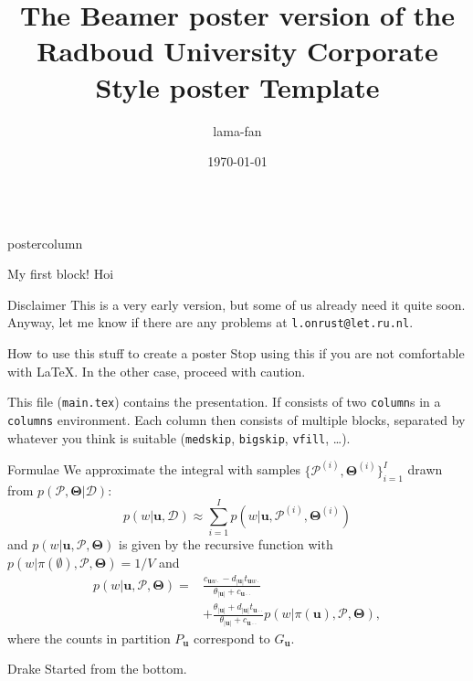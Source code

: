 \documentclass[roundedcorners=true, titleposition=left]{beamerthemeruhuisstijlposter}
\institute[CLS]{Centre for Language Studies, Radboud University Nijmegen, Nijmegen, the Netherlands}
\title{The Beamer poster version of the Radboud University Corporate Style poster Template}
\date{\today}
\author{lama-fan}
\begin{document}
\begin{frame}
\begin{columns}
\begin{column}{0.49\textwidth}
\begin{beamercolorbox}[center, wd=\textwidth]{postercolumn}
\begin{minipage}[T]{0.95\textwidth}
\parbox[t][\columnheight]{\textwidth}{%
  \begin{block}{My first block!}
  	Hoi
  \end{block}
  \medskip
  \begin{block}{Disclaimer}
  	This is a very early version, but some of us already need it quite soon. Anyway, let me know if there are any problems at \texttt{l.onrust@let.ru.nl}.
  \end{block}
 	\medskip
    \begin{block}{How to use this stuff to create a poster}
    	Stop using this if you are not comfortable with \LaTeX. In the other case, proceed with caution.
        
        This file (\texttt{main.tex}) contains the presentation. If consists of two \texttt{column}s in a \texttt{columns} environment. Each column then consists of multiple blocks, separated by whatever you think is suitable (\texttt{medskip}, \texttt{bigskip}, \texttt{vfill}, \ldots). 
    \end{block}
    \medskip
    \begin{block}{Formulae}
    	We approximate the integral with samples $\{\mathcal{P}^{(i)}, \boldsymbol\Theta^{(i)}\}_{i=1}^I$ drawn from $p(\mathcal{P}, \boldsymbol\Theta|\mathcal{D})$: 
  	\begin{equation}
    	p(w|\mathbf{u},\mathcal{D})\approx\sum_{i=1}^{I}p(w|\mathbf{u},\mathcal{P}^{(i)},\boldsymbol\Theta^{(i)})
        \end{equation}
  and $p(w|\mathbf{u}, \mathcal{P},\boldsymbol\Theta)$ is given by the recursive function with  $p(w|\pi(\emptyset),\mathcal{P},\boldsymbol\Theta) = 1/V$ and 
  \begin{equation}
  	\begin{split}
    	p(w|\mathbf{u},\mathcal{P},\boldsymbol\Theta) = &\frac{c_{\mathbf{u}w\cdot}-d_{|\mathbf{u}|}t_{\mathbf{u}w\cdot}}{\theta_{|\mathbf{u}|}+c_{\mathbf{u}\cdot\cdot}} \\
        &+ \frac{\theta_{|\mathbf{u}|}+d_{|\mathbf{u}|}t_{\mathbf{u}\cdot\cdot}}{\theta_{|\mathbf{u}|}+c_{\mathbf{u}\cdot\cdot}} p(w|\pi(\mathbf{u}),\mathcal{P},\boldsymbol\Theta),
        \end{split}
        \end{equation}
        where the counts in partition $P_{\mathbf{u}}$ correspond to $G_{\mathbf{u}}$.
    \end{block}
    \vfill
    \begin{block}{Drake}
    	Started from the bottom.
    \end{block}
}
\end{minipage}
\end{beamercolorbox}
\end{column}


\end{columns}
\end{frame}
\end{document}
